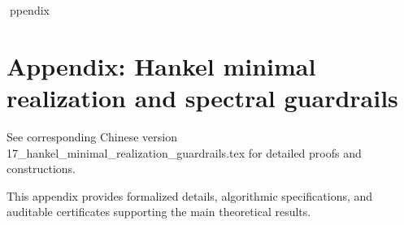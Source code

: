 ppendix

\section*{Appendix: Hankel minimal realization and spectral guardrails}

See corresponding Chinese version 17_hankel_minimal_realization_guardrails.tex for detailed proofs and constructions.

This appendix provides formalized details, algorithmic specifications, and auditable certificates supporting the main theoretical results.
